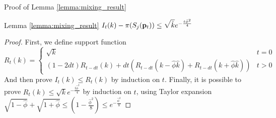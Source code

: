\documentclass[../main.tex]{subfiles}
\begin{document}
	\begin{frame}{Proof of Lemma \ref{lemma:mixing_result}}
		\begin{block}{Lemma \ref{lemma:mixing_result}}
			$I_t(k) - \pi(S_j(\bold{p}_{t})) \leq \sqrt{\hat{k}} e^{-\frac{t\hat{\phi}^2}{4}}$
		\end{block}
		\begin{proof}
			First, we define support function $$R_t(k) = \begin{cases} \sqrt{k} & t=0 \\ (1-2dt)R_{t-dt}(k) + dt(R_{t-dt}(k-\hat{\phi}\hat{k}) + R_{t-dt}(k+\hat{\phi}\hat{k})) & t>0
			\end{cases}$$
			And then prove $I_t(k)\leq R_t(k)$ by induction on $t$. Finally, it is possible to prove $R_t(k) \leq \sqrt{k}e^{-\frac{t\hat{\phi}^2}{4}}$ by induction on $t$, using Taylor expansion $\sqrt{1-\hat{\phi}}+\sqrt{1+\hat{\phi}} \leq (1-\frac{\hat{\phi}^2}{8}) \leq e^{-\frac{\hat{\phi}^2}{8}}$
		\end{proof}
	\end{frame}
\end{document}
